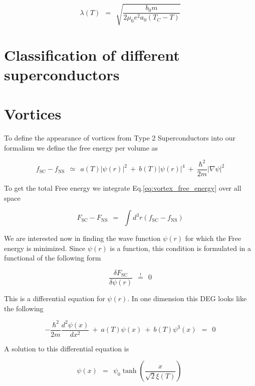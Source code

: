 \documentclass[10pt]{report}
\numberwithin{equation}{chapter}
\newcommand{\myEq}[1]{
  Eq.\ref{#1}
}
\begin{document}
\begin{equation} \label{eq:penetration_depth_temp_dep}
  \lambda(T) ~~=~~ \sqrt{\frac{b_0 m}{2 \mu_0 e^2 a_0 (T_C-T)}}
\end{equation}

\section{Classification of different superconductors}


\section{Vortices}

To define the appearance of vortices from Type 2 Superconductors into our formalism we define the free energy per volume as

\begin{equation} \label{eq:vortex_free_energy}
  f_\text{SC} - f_\text{NS} ~~≃~~ a(T) |\psi(r)|^2 ~+~ b(T)|\psi(r)|^4 ~+~ 
  \frac{\hbar^2}{2m} |\nabla \psi|^2
\end{equation}

To get the total Free energy we integrate \myEq{eq:vortex_free_energy} over all space

\begin{equation}
  F_\text{SC} - F_\text{NS} ~~=~~ \int d^3r (f_\text{SC} - f_\text{NS})
\end{equation}

We are interested now in finding the wave function $\psi(r)$ for which the Free energy is minimized. Since $\psi(r)$ is a function, this condition is formulated in a functional of the following form

\begin{equation}
  \frac{\delta F_\text{SC}}{\delta \psi(r)} ~~\overset{!}{=}~~ 0
\end{equation}

This is a differential equation for $\psi(r)$. In one dimension this DEG looks like the following

\begin{equation} \label{eq:vortex_wave_function_deg}
  -\frac{\hbar^2}{2m} \frac{d^2\psi(x)}{dx^2} ~+~ a(T) \psi(x) ~+~ b(T) \psi^3(x) ~~=~~ 0
\end{equation}

A solution to this differential equation is

\begin{equation} \label{eq:vortex_wave_function}
  \psi(x) ~~=~~ \psi_0 \tanh(\frac{x}{\sqrt{2} \xi(T)})
  \ 
\end{equation}
\end{document}
